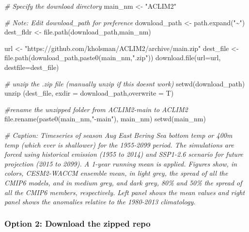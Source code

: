 \documentclass[
]{article}
\newenvironment{Shaded}{\begin{snugshade}}{\end{snugshade}}
\newcommand{\AttributeTok}[1]{\textcolor[rgb]{0.77,0.63,0.00}{#1}}
\newcommand{\CommentTok}[1]{\textcolor[rgb]{0.56,0.35,0.01}{\textit{#1}}}
\newcommand{\FunctionTok}[1]{\textcolor[rgb]{0.00,0.00,0.00}{#1}}
\newcommand{\NormalTok}[1]{#1}
\newcommand{\OtherTok}[1]{\textcolor[rgb]{0.56,0.35,0.01}{#1}}
\newcommand{\StringTok}[1]{\textcolor[rgb]{0.31,0.60,0.02}{#1}}
\begin{document}
\begin{Shaded}
\begin{Highlighting}[]
    \CommentTok{\# Specify the download directory}
\NormalTok{    main\_nm       }\OtherTok{\textless{}{-}} \StringTok{"ACLIM2"}

    \CommentTok{\# Note: Edit download\_path for preference}
\NormalTok{    download\_path }\OtherTok{\textless{}{-}}  \FunctionTok{path.expand}\NormalTok{(}\StringTok{"\textasciitilde{}"}\NormalTok{)}
\NormalTok{    dest\_fldr     }\OtherTok{\textless{}{-}} \FunctionTok{file.path}\NormalTok{(download\_path,main\_nm)}
    
\NormalTok{    url           }\OtherTok{\textless{}{-}} \StringTok{"https://github.com/kholsman/ACLIM2/archive/main.zip"}
\NormalTok{    dest\_file     }\OtherTok{\textless{}{-}} \FunctionTok{file.path}\NormalTok{(download\_path,}\FunctionTok{paste0}\NormalTok{(main\_nm,}\StringTok{".zip"}\NormalTok{))}
    \FunctionTok{download.file}\NormalTok{(}\AttributeTok{url=}\NormalTok{url, }\AttributeTok{destfile=}\NormalTok{dest\_file)}
    
    \CommentTok{\# unzip the .zip file (manually unzip if this doesn\textquotesingle{}t work)}
    \FunctionTok{setwd}\NormalTok{(download\_path)}
    \FunctionTok{unzip}\NormalTok{ (dest\_file, }\AttributeTok{exdir =}\NormalTok{ download\_path,}\AttributeTok{overwrite =}\NormalTok{ T)}
    
    \CommentTok{\#rename the unzipped folder from ACLIM2{-}main to ACLIM2}
    \FunctionTok{file.rename}\NormalTok{(}\FunctionTok{paste0}\NormalTok{(main\_nm,}\StringTok{"{-}main"}\NormalTok{), main\_nm)}
    \FunctionTok{setwd}\NormalTok{(main\_nm)}
    
    
\CommentTok{\# Caption: Timeseries of season Aug East Bering Sea bottom temp or 400m temp (which ever is shallower) for the 1955{-}2099 period. The simulations are forced using historical emission (1955 to 2014) and SSP1{-}2.6 scenario for future projection (2015 to 2099). A 1{-}year running mean is applied. Figures show, in colors, CESM2{-}WACCM ensemble mean, in light grey, the spread of all the CMIP6 models, and in medium grey, and dark grey, 80\% and 50\% the spread of all the CMIP6 members, respectively. Left panel shows the mean values and right panel shows the anomalies relative to the 1980{-}2013 climatology.}
\end{Highlighting}
\end{Shaded}

\hypertarget{option-2-download-the-zipped-repo}{%
\subsubsection{Option 2: Download the zipped
repo}\label{option-2-download-the-zipped-repo}}
\end{document}
